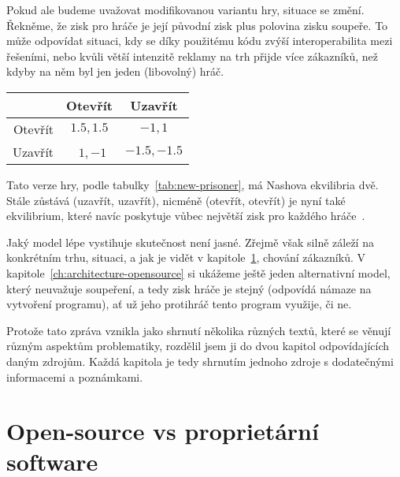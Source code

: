 \begin{multicols}{2}
Pokud ale budeme uvažovat modifikovanou variantu hry, situace se změní. Řekněme, že zisk pro hráče je její původní zisk plus polovina zisku soupeře. To může odpovídat situaci, kdy se díky použitému kódu zvýší interoperabilita mezi řešeními, nebo kvůli větší intenzitě reklamy na trh přijde více zákazníků, než kdyby na něm byl jen jeden (libovolný) hráč.

\begin{Figure}
\begin{center}
\begin{tabular}{r| c c}
		& Otevřít & Uzavřít \\
		\hline
	Otevřít &\cellcolor{gray!25}  $1.5,1.5$ & $-1,1$ \\
	Uzavřít & $1,-1$ &\cellcolor{gray!25}  $-1.5,-1.5$ \\
\end{tabular}
\end{center}
\label{tab:new-prisoner}
\end{Figure}

Tato verze hry, podle tabulky~\ref{tab:new-prisoner}, má Nashova ekvilibria dvě. Stále zůstává (uzavřít, uzavřít), nicméně (otevřít, otevřít) je nyní také ekvilibrium, které navíc poskytuje vůbec největší zisk pro každého hráče~\cite{network-effects-opensource}.

Jaký model lépe vystihuje skutečnost není jasné. Zřejmě však silně záleží na konkrétním trhu, situaci, a jak je vidět v kapitole~\ref{ch:opensource-vs-proprietary}, chování zákazníků. V kapitole~\ref{ch:architecture-opensource} si ukážeme ještě jeden alternativní model, který neuvažuje soupeření, a tedy zisk hráče je stejný (odpovídá námaze na vytvoření programu), ať už jeho protihráč tento program využije, či ne.

Protože tato zpráva vznikla jako shrnutí několika různých textů, které se věnují různým aspektům problematiky, rozdělil jsem ji do dvou kapitol odpovídajících daným zdrojům. Každá kapitola je tedy shrnutím jednoho zdroje s dodatečnými informacemi a poznámkami.




\section{Open-source vs proprietární software}
\label{ch:opensource-vs-proprietary}


\end{multicols}
